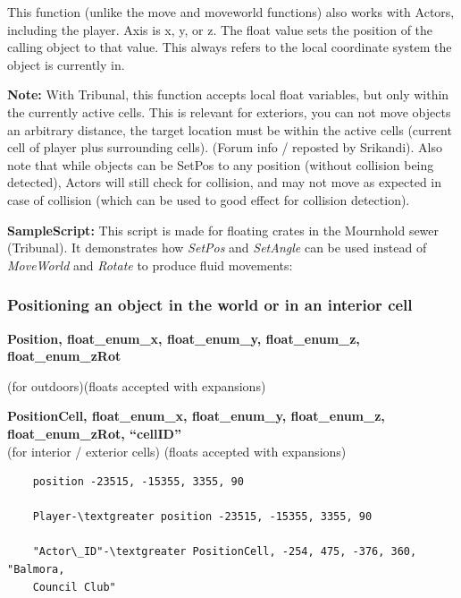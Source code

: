This function (unlike the move and moveworld functions) also works with
Actors, including the player. Axis is x, y, or z. The float value sets
the position of the calling object to that value. This always refers to
the local coordinate system the object is currently in.

\textbf{Note:} With Tribunal, this function accepts local float
variables, but only within the currently active cells. This is relevant
for exteriors, you can not move objects an arbitrary distance, the
target location must be within the active cells (current cell of player
plus surrounding cells). (Forum info / reposted by Srikandi). Also note
that while objects can be SetPos to any position (without collision
being detected), Actors will still check for collision, and may not move
as expected in case of collision (which can be used to good effect for
collision detection).

\textbf{SampleScript:} This script is made for floating crates in the
Mournhold sewer (Tribunal). It demonstrates how \emph{SetPos} and
\emph{SetAngle} can be used instead of \emph{MoveWorld} and
\emph{Rotate} to produce fluid movements:



\hypertarget{positioning-an-object-in-the-world-or-in-an-interior-cell}{%
\subsubsection{Positioning an object in the world or in an interior
cell}\label{positioning-an-object-in-the-world-or-in-an-interior-cell}}

	\textbf{Position, float\_enum\_x, float\_enum\_y, float\_enum\_z,
		float\_enum\_zRot}

(for outdoors)(floats accepted with expansions)

	\textbf{PositionCell, float\_enum\_x, float\_enum\_y, float\_enum\_z,
		float\_enum\_zRot, ``cellID''\\
	}(for interior / exterior cells) (floats accepted with expansions)


\begin{lstlisting}	
	position -23515, -15355, 3355, 90
	
	Player-\textgreater position -23515, -15355, 3355, 90
	
	"Actor\_ID"-\textgreater PositionCell, -254, 475, -376, 360, "Balmora,
	Council Club"
\end{lstlisting}

